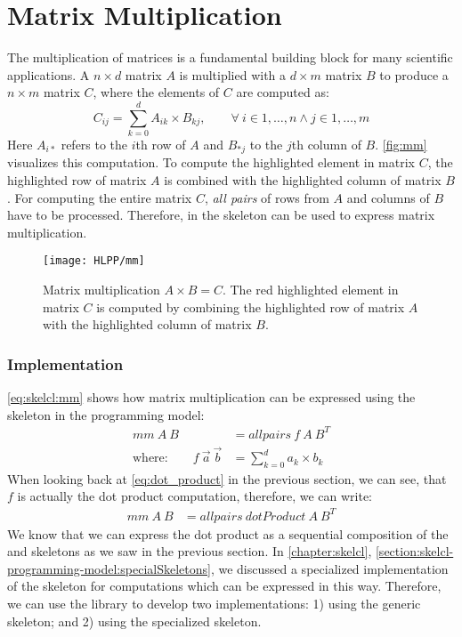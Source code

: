 \section{Matrix Multiplication}
\label{section:skelcl:matrixMult}

The multiplication of matrices is a fundamental building block for many scientific applications.
A $n\times d$ matrix $A$ is multiplied with a $d\times m$ matrix $B$ to produce a $n\times m$ matrix $C$, where the elements of $C$ are computed as:
\begin{equation*}
  C_{ij} = \sum_{k=0}^{d} A_{ik} \times B_{kj}, \qquad \forall\ i \in 1, \ldots, n \wedge j \in 1, \ldots, m
\end{equation*}
Here $A_{i*}$ refers to the $i$th row of $A$ and $B_{*j}$ to the $j$th column of $B$.
\autoref{fig:mm} visualizes this computation.
To compute the highlighted element in matrix $C$, the highlighted row of matrix $A$ is combined with the highlighted column of matrix $B$.
For computing the entire matrix $C$, \emph{all pairs} of rows from $A$ and columns of $B$ have to be processed.
Therefore, in \SkelCL the \allpairs skeleton can be used to express matrix multiplication.

\begin{figure}[tb]
  \centering
  \texttt{[image: HLPP/mm]}
  \caption[Visalization of matrix multiplication.]%
          {Matrix multiplication $A\times B = C$.
           The red highlighted element in matrix $C$ is computed by combining the highlighted row of matrix $A$ with the highlighted column of matrix $B$.}
  \label{fig:mm}
\end{figure}


\subsubsection*{\SkelCL Implementation}
\autoref{eq:skelcl:mm} shows how matrix multiplication can be expressed using the \allpairs skeleton in the \SkelCL programming model:
\begin{align}
  \label{eq:skelcl:mm}
  mm\ A\ B &= allpairs\ f\ A\ B^T\\
  \text{where:} \qquad f\ \vec{a}\ \vec{b} &= \sum_{k=0}^d a_k \times b_k \nonumber
\end{align}
When looking back at \autoref{eq:dot_product} in the previous section, we can see, that $f$ is actually the dot product computation, therefore, we can write:
\begin{align}
  mm\ A\ B &= allpairs\ dotProduct\ A\ B^T
  \label{eq:skelcl:mm:dot}
\end{align}
We know that we can express the dot product as a sequential composition of the \zip and \reduce skeletons as we saw in the previous section.
In \autoref{chapter:skelcl}, \autoref{section:skelcl-programming-model:specialSkeletons}, we discussed a specialized implementation of the \allpairs skeleton for computations which can be expressed in this way.
Therefore, we can use the \SkelCL library to develop two implementations:
1) using the generic \allpairs skeleton; and 2) using the specialized \allpairs skeleton.

